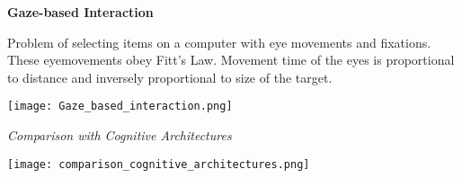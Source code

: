 \textbf{Gaze-based Interaction} \smallskip

Problem of selecting items on a computer with eye movements and fixations. These eyemovements obey Fitt's Law. 
Movement time of the eyes is proportional to distance and inversely proportional to size of the target.


\begin{center}
	\texttt{[image: Gaze\_based\_interaction.png]}
\end{center}



\textit{Comparison with Cognitive Architectures}


\begin{center}
	\texttt{[image: comparison\_cognitive\_architectures.png]}
\end{center}












